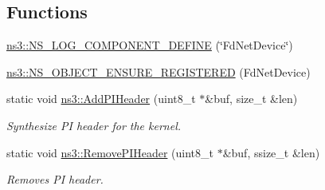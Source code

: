 \subsection*{Functions}
\begin{DoxyCompactItemize}
\item 
\hyperlink{namespacens3_aa6fb46394eaded91e6aba1771a6d3a38}{ns3\+::\+N\+S\+\_\+\+L\+O\+G\+\_\+\+C\+O\+M\+P\+O\+N\+E\+N\+T\+\_\+\+D\+E\+F\+I\+NE} (\char`\"{}Fd\+Net\+Device\char`\"{})
\item 
\hyperlink{namespacens3_a1df6be176b3cd980780a6de3c7574c7c}{ns3\+::\+N\+S\+\_\+\+O\+B\+J\+E\+C\+T\+\_\+\+E\+N\+S\+U\+R\+E\+\_\+\+R\+E\+G\+I\+S\+T\+E\+R\+ED} (Fd\+Net\+Device)
\item 
static void \hyperlink{group__fd-net-device_gad3e41a1d562aec7c106c65c5964071b6}{ns3\+::\+Add\+P\+I\+Header} (uint8\+\_\+t $\ast$\&buf, size\+\_\+t \&len)
\begin{DoxyCompactList}\small\item\em Synthesize PI header for the kernel. \end{DoxyCompactList}\item 
static void \hyperlink{group__fd-net-device_ga297e68cd3a421ef11540f26b073ea881}{ns3\+::\+Remove\+P\+I\+Header} (uint8\+\_\+t $\ast$\&buf, ssize\+\_\+t \&len)
\begin{DoxyCompactList}\small\item\em Removes PI header. \end{DoxyCompactList}\end{DoxyCompactItemize}
